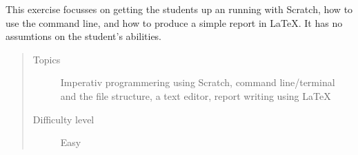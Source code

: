This exercise focusses on getting the students up an running with
Scratch, how to use the command line, and how to produce a simple
report in \LaTeX. It has no assumtions on the student's abilities.
\begin{quote}
  \begin{description}
  \item[Topics] Imperativ programmering using Scratch, command
    line/terminal and the file structure, a text editor, report
    writing using \LaTeX
  \item[Difficulty level] Easy
  \end{description}
\end{quote}